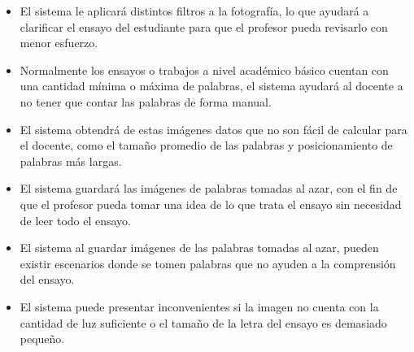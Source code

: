 \documentclass[11pt,a4paper]{markdown}
\begin{document}
\begin{itemize}
  \item El sistema le aplicará distintos filtros a la fotografía, lo que ayudará a clarificar el ensayo del estudiante para que el profesor pueda revisarlo con menor esfuerzo.
  \item Normalmente los ensayos o trabajos a nivel académico básico cuentan con una cantidad mínima o máxima de palabras, el sistema ayudará al docente a no tener que contar las palabras de forma manual.
  \item El sistema obtendrá de estas imágenes datos que no son fácil de calcular para el docente, como el tamaño promedio de las palabras y posicionamiento de palabras más largas.
  \item El sistema guardará las imágenes de palabras tomadas al azar, con el fin de que el profesor pueda tomar una idea de lo que trata el ensayo sin necesidad de leer todo el ensayo.
\end{itemize}


\begin{itemize}
  \item El sistema al guardar imágenes de las palabras tomadas al azar, pueden existir escenarios donde se tomen palabras que no ayuden a la comprensión del ensayo.
  \item El sistema puede presentar inconvenientes si la imagen no cuenta con la cantidad de luz suficiente o el tamaño de la letra del ensayo es demasiado pequeño.
\end{itemize}
\end{document}
